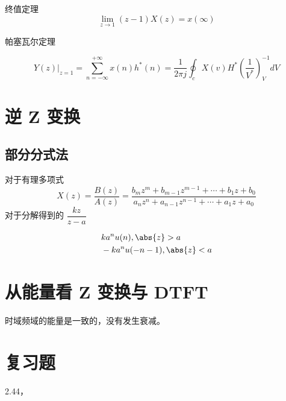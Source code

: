 \documentclass[cn,11pt,chinese,black,simple]{elegantbook}
\begin{document}
终值定理 \[\lim_{z\rightarrow 1}(z-1)X(z) = x(\infty)\]

帕塞瓦尔定理

\[
\left.Y(z)\right|_{z=1}=\sum_{n=-\infty}^{+\infty} x(n) h^{*}(n)=\frac{1}{2 \pi j} \oint_{c} X(v) H^{*}\left(\frac{1}{V^{*}}\right)_{V}^{-1} d V
\]

\section{逆 Z 变换}

\subsection{部分分式法}

对于有理多项式 \[
    X(z)=\dfrac{B(z)}{A(z)}=\dfrac{b_{m} z^{m}+b_{m-1} z^{m-1}+\cdots+b_{1} z+b_{0}}{a_{n} z^{n}+a_{n-1} z^{n-1}+\cdots+a_{1} z+a_{0}}
\]
对于分解得到的 \(\dfrac{k z}{z-a}\)

\[
\begin{aligned}
    &k a^n u(n), \abs{z} > a\\
    &-k a^n u(-n-1), \abs{z} < a\\
\end{aligned}    
\]

\section{从能量看 Z 变换与 DTFT} 

时域频域的能量是一致的，没有发生衰减。


\section*{复习题}

2.44，

\let\chapname\undefined
\ifx\mainclass\undefined
\end{document}
